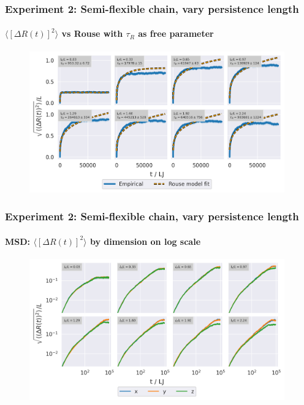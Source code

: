 \documentclass[handout]{beamer}
\newcommand{\mean}[1]{\langle #1 \rangle}
\begin{document}
\begin{frame}
    \frametitle{Experiment 2: Semi-flexible chain, vary persistence length}
    \framesubtitle{$\mean{[\Delta R(t)]^2}$ vs Rouse with $\tau_R$ as free parameter}

    \begin{figure}[h]
        \includegraphics[width=11cm]{./4-exp-delta_R-rouse_fit-tau.png}
    \end{figure}
\end{frame}

\begin{frame}
    \frametitle{Experiment 2: Semi-flexible chain, vary persistence length}
    \framesubtitle{MSD: $\mean{[\Delta R(t)]^2}$ by dimension on log scale}

    \begin{figure}[h]
        \includegraphics[width=11cm]{./4-exp-msd_by_dim-log.png}
    \end{figure}
\end{frame}
\end{document}
